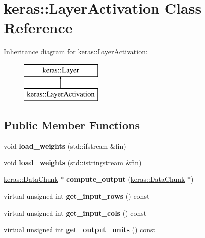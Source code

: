 \hypertarget{classkeras_1_1_layer_activation}{}\section{keras\+:\+:Layer\+Activation Class Reference}
\label{classkeras_1_1_layer_activation}
Inheritance diagram for keras\+:\+:Layer\+Activation\+:\begin{figure}[H]
\begin{center}
\leavevmode
\includegraphics[height=2.000000cm]{classkeras_1_1_layer_activation}
\end{center}
\end{figure}
\subsection*{Public Member Functions}
\begin{DoxyCompactItemize}
\item 
\mbox{\label{classkeras_1_1_layer_activation_ab84c8be236ec0a2e09739aa7616463be}} 
void {\bfseries load\+\_\+weights} (std\+::ifstream \&fin)
\item 
\mbox{\label{classkeras_1_1_layer_activation_ae4f3e8ad0c8743e44ec622549cda0861}} 
void {\bfseries load\+\_\+weights} (std\+::istringstream \&fin)
\item 
\mbox{\label{classkeras_1_1_layer_activation_a7d3c54078470ed3c46ed56f027d2a933}} 
\mbox{\hyperlink{classkeras_1_1_data_chunk}{keras\+::\+Data\+Chunk}} $\ast$ {\bfseries compute\+\_\+output} (\mbox{\hyperlink{classkeras_1_1_data_chunk}{keras\+::\+Data\+Chunk}} $\ast$)
\item 
\mbox{\label{classkeras_1_1_layer_activation_a13b37e53a7a9596fdf5054e944fe0667}} 
virtual unsigned int {\bfseries get\+\_\+input\+\_\+rows} () const
\item 
\mbox{\label{classkeras_1_1_layer_activation_af70e0740fc42167b37486e7e5ebc62ef}} 
virtual unsigned int {\bfseries get\+\_\+input\+\_\+cols} () const
\item 
\mbox{\label{classkeras_1_1_layer_activation_a7a325387307f8cfb726fff242452211d}} 
virtual unsigned int {\bfseries get\+\_\+output\+\_\+units} () const
\end{DoxyCompactItemize}
